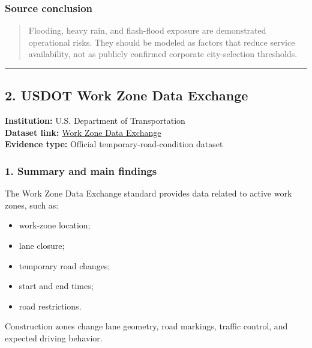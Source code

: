 \documentclass[10pt,a4paper]{article}
\providecommand{\tightlist}{\setlength{\itemsep}{0pt}\setlength{\parskip}{0pt}}
\begin{document}
\hypertarget{source-conclusion-4}{%
\subsubsection{Source conclusion}\label{source-conclusion-4}}

\begin{quote}
Flooding, heavy rain, and flash-flood exposure are demonstrated operational risks. They should be modeled as factors that reduce service availability, not as publicly confirmed corporate city-selection thresholds.
\end{quote}

\begin{center}\rule{0.5\linewidth}{0.5pt}\end{center}

\hypertarget{usdot-work-zone-data-exchange}{%
\subsection{2. USDOT Work Zone Data Exchange}\label{usdot-work-zone-data-exchange}}

\textbf{Institution:} U.S. Department of Transportation\\
\textbf{Dataset link:} \href{https://www.transportation.gov/av/data/wzdx}{Work Zone Data Exchange}\\
\textbf{Evidence type:} Official temporary-road-condition dataset

\hypertarget{summary-and-main-findings-5}{%
\subsubsection{1. Summary and main findings}\label{summary-and-main-findings-5}}

The Work Zone Data Exchange standard provides data related to active work zones, such as:

\begin{itemize}
\tightlist
\item
  work-zone location;
\item
  lane closure;
\item
  temporary road changes;
\item
  start and end times;
\item
  road restrictions.
\end{itemize}

Construction zones change lane geometry, road markings, traffic control, and expected driving behavior.
\end{document}
